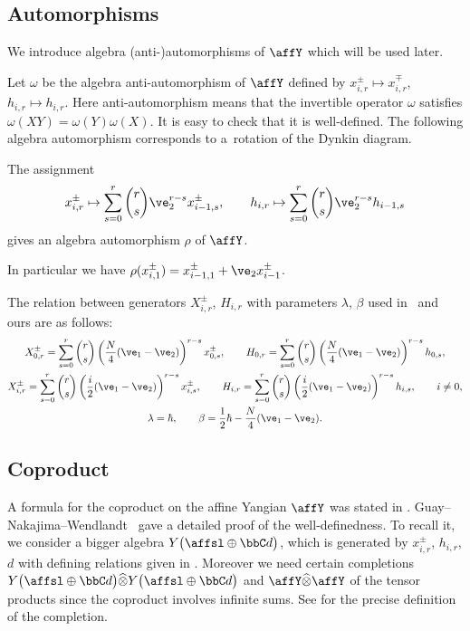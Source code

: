 \subsection{Automorphisms}

We introduce algebra (anti-)automorphisms of $\affY$ which will be used later.

Let $\omega$ be the algebra anti-automorphism of $\affY$ defined by $x_{i,r}^{\pm} \mapsto x_{i,r}^{\mp}$, $h_{i,r} \mapsto h_{i,r}$. Here anti-automorphism means that the invertible operator $\omega$ satisfies $\omega(XY)=\omega(Y)\omega(X)$. It is easy to check that it is well-defined. The following algebra automorphism corresponds to a~rotation of the Dynkin diagram.
\begin{prop}[{\cite[Lemma~3.5]{MR2199856}}] The assignment
\begin{gather*}
x_{i,r}^{\pm} \mapsto \sum_{s=0}^r \dbinom{r}{s} \ve_2^{r-s} x_{i-1,s}^{\pm}, \qquad h_{i,r} \mapsto \sum_{s=0}^r \dbinom{r}{s} \ve_2^{r-s} h_{i-1,s}
\end{gather*}
gives an algebra automorphism $\rho$ of $\affY$.
\end{prop}
In particular we have $\rho(x_{i,1}^{\pm}) = x_{i-1,1}^{\pm} + \ve_2 x_{i-1}^{\pm}$.
\begin{rem}The relation between generators $X_{i,r}^{\pm}$, $H_{i,r}$ with parameters $\lambda$, $\beta$ used in~\cite{MR2199856,MR2323534} and ours are as follows:
\begin{gather*}
X_{0,r}^{\pm} = \sum_{s=0}^r \dbinom{r}{s} \left( \dfrac{N}{4}(\ve_1-\ve_2)\right)^{r-s} x_{0,s}^{\pm},\qquad H_{0,r} = \sum_{s=0}^r \dbinom{r}{s} \left( \dfrac{N}{4}(\ve_1-\ve_2)\right)^{r-s} h_{0,s},\\
X_{i,r}^{\pm} = \sum_{s=0}^r \dbinom{r}{s} \left( \dfrac{i}{2}(\ve_1-\ve_2)\right)^{r-s} x_{i,s}^{\pm}, \qquad H_{i,r} = \sum_{s=0}^r \dbinom{r}{s} \left( \dfrac{i}{2}(\ve_1-\ve_2)\right)^{r-s} h_{i,s}, \qquad i \neq 0,\\
\lambda = \hbar, \qquad \beta = \frac{1}{2} \hbar - \dfrac{N}{4}(\ve_1-\ve_2).
\end{gather*}
\end{rem}

\subsection{Coproduct}

A formula for the coproduct on the affine Yangian $\affY$ was stated in \cite{MR2323534}. Guay--Nakajima--Wendlandt~\cite{MR3861718} gave a detailed proof of the well-definedness. To recall it, we consider a bigger algebra $Y\big(\affsl \oplus \bbC d\big)$, which is generated by $x_{i,r}^{\pm}$, $h_{i,r}$, $d$ with defining relations given in \cite[equation~(2.8)]{MR3861718}. Moreover we need certain completions $Y\big(\affsl \oplus \bbC d\big) \widehat{\otimes} Y\big(\affsl \oplus \bbC d\big)$ and $\affY \widehat{\otimes} \affY$ of the tensor products since the coproduct involves infinite sums. See \cite[Section~5]{MR3861718} for the precise definition of the completion.

